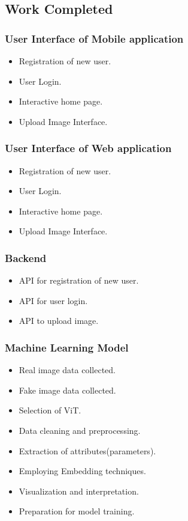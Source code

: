 \subsection{Work Completed}
\subsubsection{User Interface of Mobile application}
\begin{itemize}
    \item Registration of new user.
    \item User Login.
    \item Interactive home page.
    \item Upload Image Interface.
\end{itemize}
\subsubsection{User Interface of Web application}
\begin{itemize}
    \item Registration of new user.
    \item User Login.
    \item Interactive home page.
    \item Upload Image Interface.
\end{itemize}
\subsubsection{Backend}
\begin{itemize}
    \item API for registration of new user.
    \item API for user login.
    \item API to upload image.
\end{itemize}
\subsubsection{Machine Learning Model}
\begin{itemize}
    \item Real image data collected.
    \item Fake image data collected.
    \item Selection of ViT.
    \item Data cleaning and preprocessing.
    \item Extraction of attributes(parameters).
    \item Employing Embedding techniques.
    \item Visualization and interpretation.
    \item Preparation for model training.
\end{itemize}

